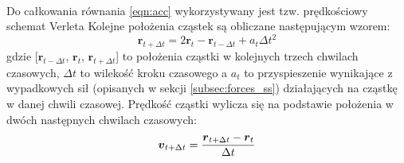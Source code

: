 \paragraph{}
Do całkowania równania \eqref{eqn:acc} wykorzystywany jest tzw. prędkościowy schemat Verleta \cite{wiki:2} Kolejne położenia cząstek są obliczane następującym wzorem:
\begin{equation}
\boldsymbol{r}_{t+\Delta t} = 2\boldsymbol{r}_t - \boldsymbol{r}_{t-\Delta t} + a_t\Delta t^2
\label{eqn:verlet_pos_int}
\end{equation}
gdzie [$\boldsymbol{r}_{t-\Delta t}$, $\boldsymbol{r}_{t}$, $\boldsymbol{r}_{t+\Delta t}$] to położenia cząstki w kolejnych trzech chwilach czasowych, ${\Delta t}$ to wilekość kroku czasowego a $a_t$ to przyspieszenie wynikające z wypadkowych sił (opisanych w sekcji \eqref{subsec:forces_ss}) działających na cząstkę w danej chwili czasowej. Prędkość cząstki wylicza się na podstawie położenia w dwóch następnych chwilach czasowych:
\begin{equation}
\boldsymbol{v}_{t+\Delta t} = {\boldsymbol{r}_{t+\Delta t} - \boldsymbol{r}_{t} \over \Delta t}
\label{eqn:verlet_vel_int}
\end{equation}
\par
